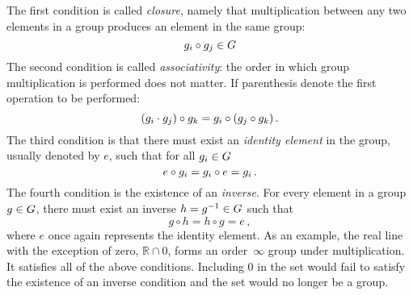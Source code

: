 The first condition is called \emph{closure}, namely that
multiplication between any two elements in a group produces an
element in the same group:
\[
 g_i \circ g_j \in G
\]
The second condition is called \emph{associativity}:
the order in which group multiplication is performed
does not matter.  If parenthesis denote the first operation to
be performed:
\[
 (g_i \cdot g_j) \circ g_k
   = g_i \circ (g_j \circ g_k)
\,.
\]
The third condition is that there must exist an \emph{identity
element} in the group, usually denoted by $e$, such that for all
$g_i \in G$
\[
 e \circ g_i = g_i \circ e = g_i
\,.
\]
The fourth condition is the existence of an \emph{inverse}.  For every
element in a group $g \in G$, there must exist an inverse
$h = g^{-1} \in G$ such that
\[
 g\circ h = h\circ g = e
\,,
\]
where $e$ once again represents the identity element.  As an
example, the real line with the exception of zero, $\mathbb{R}
\cap 0$, forms an order~$\infty$ group under multiplication.
It satisfies all of the above
conditions.  Including $0$ in the set would fail to satisfy the
existence of an inverse condition and the set would no longer
be a group.

